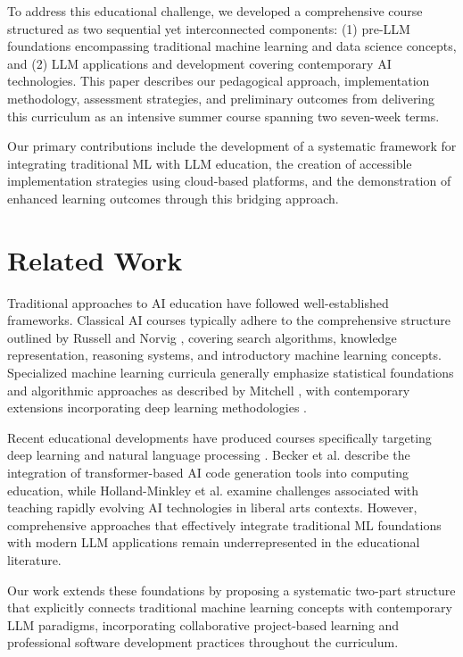 \documentclass{article}
\begin{document}
To address this educational challenge, we developed a comprehensive
course structured as two sequential yet interconnected components: (1)
pre-LLM foundations encompassing traditional machine learning and data
science concepts, and (2) LLM applications and development covering
contemporary AI technologies. This paper describes our pedagogical
approach, implementation methodology, assessment strategies, and
preliminary outcomes from delivering this curriculum as an intensive
summer course spanning two seven-week terms.

Our primary contributions include the development of a systematic
framework for integrating traditional ML with LLM education, the
creation of accessible implementation strategies using cloud-based
platforms, and the demonstration of enhanced learning outcomes through
this bridging approach.

\section{Related Work}

Traditional approaches to AI education have followed well-established frameworks. Classical AI courses typically adhere to the comprehensive structure outlined by Russell and Norvig \cite{russell2010artificial}, covering search algorithms, knowledge representation, reasoning systems, and introductory machine learning concepts. Specialized machine learning curricula generally emphasize statistical foundations and algorithmic approaches as described by Mitchell \cite{mitchell1997machine}, with contemporary extensions incorporating deep learning methodologies \cite{goodfellow2016deep}.

Recent educational developments have produced courses specifically targeting deep learning \cite{ng2018deep} and natural language processing \cite{jurafsky2000speech}. Becker et al. \cite{becker2023programming} describe the integration of transformer-based AI code generation tools into computing education, while Holland-Minkley et al. \cite{holland2023computer} examine challenges associated with teaching rapidly evolving AI technologies in liberal arts contexts. However, comprehensive approaches that effectively integrate traditional ML foundations with modern LLM applications remain underrepresented in the educational literature.

Our work extends these foundations by proposing a systematic two-part structure that explicitly connects traditional machine learning concepts with contemporary LLM paradigms, incorporating collaborative project-based learning and professional software development practices throughout the curriculum.
\end{document}

